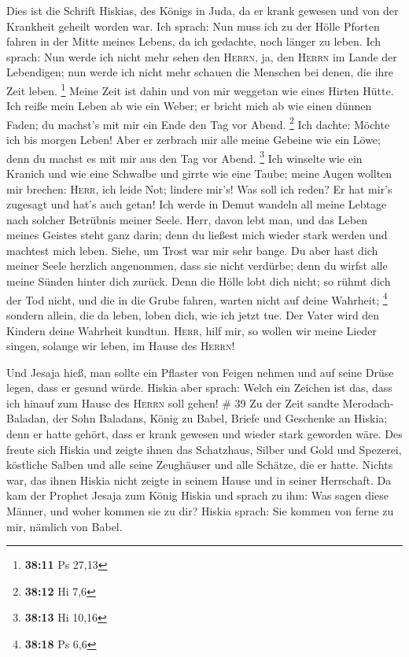  Dies ist die Schrift Hiskias, des Königs in Juda, da er
krank gewesen und von der Krankheit geheilt worden war. 
Ich sprach: Nun muss ich zu der Hölle Pforten fahren in der Mitte meines
Lebens, da ich gedachte, noch länger zu leben.  Ich
sprach: Nun werde ich nicht mehr sehen den \textsc{Herrn}, ja, den
\textsc{Herrn} im Lande der Lebendigen; nun werde ich nicht mehr schauen
die Menschen bei denen, die ihre Zeit leben. \footnote{\textbf{38:11} Ps
  27,13}  Meine Zeit ist dahin und von mir weggetan wie
eines Hirten Hütte. Ich reiße mein Leben ab wie ein Weber; er bricht
mich ab wie einen dünnen Faden; du machst's mit mir ein Ende den Tag vor
Abend. \footnote{\textbf{38:12} Hi 7,6}  Ich dachte:
Möchte ich bis morgen Leben! Aber er zerbrach mir alle meine Gebeine wie
ein Löwe; denn du machst es mit mir aus den Tag vor Abend. \footnote{\textbf{38:13}
  Hi 10,16}  Ich winselte wie ein Kranich und wie eine
Schwalbe und girrte wie eine Taube; meine Augen wollten mir brechen:
\textsc{Herr}, ich leide Not; lindere mir's!  Was soll
ich reden? Er hat mir's zugesagt und hat's auch getan! Ich werde in
Demut wandeln all meine Lebtage nach solcher Betrübnis meiner Seele.
 Herr, davon lebt man, und das Leben meines Geistes steht
ganz darin; denn du ließest mich wieder stark werden und machtest mich
leben.  Siehe, um Trost war mir sehr bange. Du aber hast
dich meiner Seele herzlich angenommen, dass sie nicht verdürbe; denn du
wirfst alle meine Sünden hinter dich zurück.  Denn die
Hölle lobt dich nicht; so rühmt dich der Tod nicht, und die in die Grube
fahren, warten nicht auf deine Wahrheit; \footnote{\textbf{38:18} Ps 6,6}
 sondern allein, die da leben, loben dich, wie ich jetzt
tue. Der Vater wird den Kindern deine Wahrheit kundtun. 
\textsc{Herr}, hilf mir, so wollen wir meine Lieder singen, solange wir
leben, im Hause des \textsc{Herrn}!

 Und Jesaja hieß, man sollte ein Pflaster von Feigen
nehmen und auf seine Drüse legen, dass er gesund würde. 
Hiskia aber sprach: Welch ein Zeichen ist das, dass ich hinauf zum Hause
des \textsc{Herrn} soll gehen! \# 39  Zu der Zeit sandte
Merodach-Baladan, der Sohn Baladans, König zu Babel, Briefe und
Geschenke an Hiskia; denn er hatte gehört, dass er krank gewesen und
wieder stark geworden wäre.  Des freute sich Hiskia und
zeigte ihnen das Schatzhaus, Silber und Gold und Spezerei, köstliche
Salben und alle seine Zeughäuser und alle Schätze, die er hatte. Nichts
war, das ihnen Hiskia nicht zeigte in seinem Hause und in seiner
Herrschaft.  Da kam der Prophet Jesaja zum König Hiskia
und sprach zu ihm: Was sagen diese Männer, und woher kommen sie zu dir?
Hiskia sprach: Sie kommen von ferne zu mir, nämlich von Babel.

